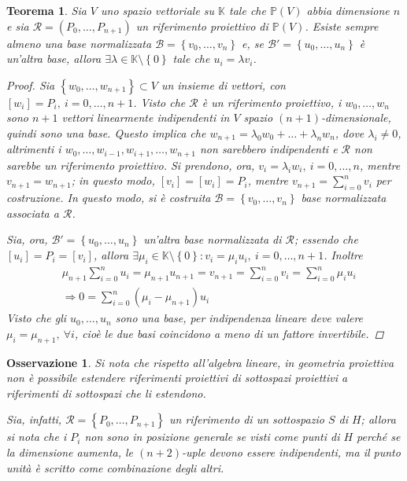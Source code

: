 \documentclass[12pt]{scrartcl}
\theoremstyle{style}
\newtheorem{teorema}{Teorema}[section]
\newtheorem{osservazione}{Osservazione}[section]
\numberwithin{equation}{subsection}
\begin{document}
\begin{teorema}
	Sia $V$ uno spazio vettoriale su $\mathbb{K}$ tale che $\mathbb{P}(V)$ abbia dimensione $n$ e sia $\mathcal{R} =(P_0,\ldots,P_{n+1} )$ un riferimento proiettivo di $\mathbb{P}(V)$.
	Esiste sempre almeno una base normalizzata $\mathcal{B} = \left\{ v_0, \ldots,v_n\right\} $ e, se $\mathcal{B} ' = \left\{ u_0,\ldots,u_n \right\} $ \`e un'altra base, allora $\exists \lambda \in \mathbb{K}\setminus\left\{ 0 \right\} $ tale che $u_i = \lambda v_i$.
	\begin{proof}
		Sia $\left\{ w_0, \ldots,w_{n+1}  \right\} \subset V$ un insieme di vettori, con $[w_i] = P_i, \ i=0,\ldots,n+1$.
		Visto che $\mathcal{R}$ \`e un riferimento proiettivo, i $w_0,\ldots,w_n$ sono $n+1$ vettori linearmente indipendenti in $V$ spazio $(n+1)$-dimensionale, quindi sono una base.
		Questo implica che $w_{n+1} = \lambda _0 w_0 + \ldots + \lambda _n w_n$, dove $\lambda _i\neq 0$, altrimenti i $w_0,\ldots,w_{i-1} , w_{i+1} , \ldots, w_{n+1} $ non sarebbero indipendenti e $\mathcal{R} $ non sarebbe un riferimento proiettivo.
		Si prendono, ora, $v_i = \lambda _i w_i, \ i =0,\ldots,n$, mentre $v_{n+1} =w_{n+1} $; in questo modo, $[v_i]=[w_i] = P_i$, mentre $v_{n+1} = \sum_{i=0}^{n} v_i$ per costruzione.
		In questo modo, si \`e costruita $\mathcal{B} =\left\{ v_0,\ldots,v_n \right\} $ base normalizzata associata a $\mathcal{R} $.

		Sia, ora, $\mathcal{B} ' = \left\{ u_0,\ldots,u_n \right\} $ un'altra base normalizzata di $\mathcal{R} $; essendo che $[u_i] = P_i = [v_i]$, allora $\exists \mu _i \in \mathbb{K}\setminus\left\{ 0 \right\} : v_i = \mu _i u_i, \ i =0,\ldots,n+1$.
		Inoltre
		\[
			\begin{split}
				&\mu _{n+1} \sum_{i=0}^{n} u_i = \mu _{n+1} u_{n+1} = v_{n+1} = \sum_{i=0}^{n} v_i = \sum_{i=0}^{n} \mu _i u_i\\
				&\Rightarrow 0 = \sum_{i=0}^{n} (\mu _i-\mu _{n+1} ) u_i
			\end{split}
		\] 
	Visto che gli $u_0,\ldots,u_n$ sono una base, per indipendenza lineare deve valere $\mu _i = \mu _{n+1} , \ \forall i$, cio\`e le due basi coincidono a meno di un fattore invertibile.
	\end{proof}
\end{teorema}
\begin{osservazione}
Si nota che rispetto all'algebra lineare, in geometria proiettiva non \`e possibile estendere riferimenti proiettivi di sottospazi proiettivi a riferimenti di sottospazi che li estendono.

Sia, infatti, $\mathcal{R} = \left\{ P_0,\ldots,P_{n+1}  \right\}  $ un riferimento di un sottospazio $S $ di $H$; allora si nota che i $P_i$ non sono in posizione generale se visti come punti di $H$ perch\'e se la dimensione aumenta, le $(n+2)$-uple devono essere indipendenti, ma il punto unit\`a \`e scritto come combinazione degli altri.
\end{osservazione}
\end{document}
